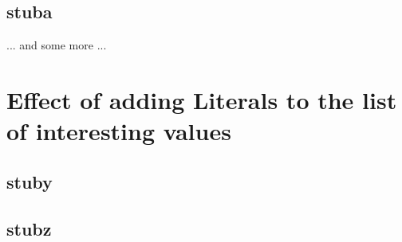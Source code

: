 \subsection{stuba}
... and some more ...


\section{Effect of adding Literals to the list of interesting values}
\subsection{stuby}
\subsection{stubz}




